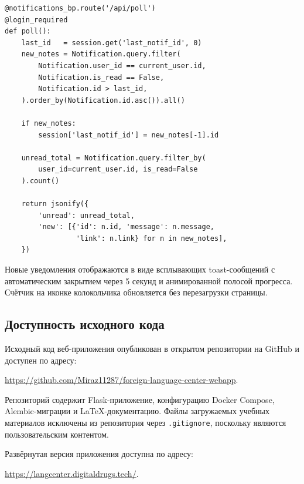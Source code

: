 \begin{lstlisting}[caption={Эндпоинт polling уведомлений (app/notifications/routes.py)}, label={lst:poll}]
@notifications_bp.route('/api/poll')
@login_required
def poll():
    last_id   = session.get('last_notif_id', 0)
    new_notes = Notification.query.filter(
        Notification.user_id == current_user.id,
        Notification.is_read == False,
        Notification.id > last_id,
    ).order_by(Notification.id.asc()).all()

    if new_notes:
        session['last_notif_id'] = new_notes[-1].id

    unread_total = Notification.query.filter_by(
        user_id=current_user.id, is_read=False
    ).count()

    return jsonify({
        'unread': unread_total,
        'new': [{'id': n.id, 'message': n.message,
                 'link': n.link} for n in new_notes],
    })
\end{lstlisting}

Новые уведомления отображаются в виде всплывающих toast-сообщений
с автоматическим закрытием через 5 секунд и анимированной полосой
прогресса. Счётчик на иконке колокольчика обновляется без перезагрузки
страницы.

\subsection{Доступность исходного кода}

Исходный код веб-приложения опубликован в открытом репозитории на GitHub
и доступен по адресу:

\begin{center}
    \url{https://github.com/Miraz11287/foreign-language-center-webapp}.
\end{center}

Репозиторий содержит Flask-приложение, конфигурацию Docker Compose,
Alembic-миграции и LaTeX-документацию. Файлы загружаемых учебных
материалов исключены из репозитория через \texttt{.gitignore},
поскольку являются пользовательским контентом.

Развёрнутая версия приложения доступна по адресу:

\begin{center}
    \url{https://langcenter.digitaldrugs.tech/}.
\end{center}
